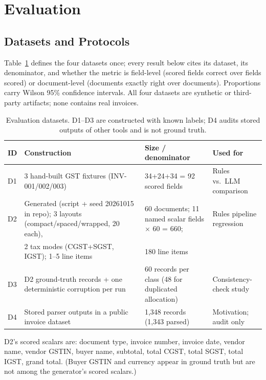 \documentclass[conference]{IEEEtran}
\begin{document}
\section{Evaluation}
\subsection{Datasets and Protocols}
Table~\ref{tab:datasets} defines the four datasets once; every result below cites its dataset, its denominator, and whether the metric is field-level (scored fields correct over fields scored) or document-level (documents exactly right over documents). Proportions carry Wilson 95\% confidence intervals. All four datasets are synthetic or third-party artifacts; none contains real invoices.

\begin{table}[t]
\caption{Evaluation datasets. D1--D3 are constructed with known labels; D4 audits stored outputs of other tools and is not ground truth.}
\label{tab:datasets}
\centering
\begin{tabular}{llll}
\toprule
ID & Construction & Size / denominator & Used for \\
\midrule
D1 & 3 hand-built GST fixtures (INV-001/002/003) & 34+24+34 = 92 scored fields & Rules vs.\ LLM comparison \\
D2 & Generated (script + seed 20261015 in repo); 3 layouts (compact/spaced/wrapped, 20 each), & 60 documents; 11 named scalar fields $\times$ 60 = 660; & Rules pipeline regression \\
   & 2 tax modes (CGST+SGST, IGST); 1--5 line items & 180 line items & \\
D3 & D2 ground-truth records + one deterministic corruption per run & 60 records per class (48 for duplicated allocation) & Consistency-check study \\
D4 & Stored parser outputs in a public invoice dataset & 1,348 records (1,343 parsed) & Motivation; audit only \\
\bottomrule
\end{tabular}
\end{table}

D2's scored scalars are: document type, invoice number, invoice date, vendor name, vendor GSTIN, buyer name, subtotal, total CGST, total SGST, total IGST, grand total. (Buyer GSTIN and currency appear in ground truth but are not among the generator's scored scalars.)
\end{document}
